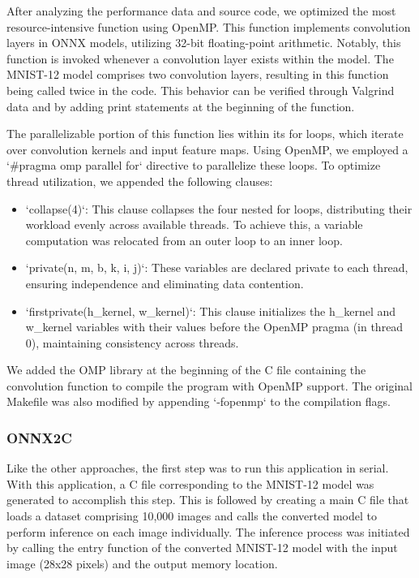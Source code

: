 \documentclass[fleqn,10pt]{olplainarticle}
\begin{document}
After analyzing the performance data and source code, we optimized the most resource-intensive function using OpenMP. This function implements convolution layers in ONNX models, utilizing 32-bit floating-point arithmetic. Notably, this function is invoked whenever a convolution layer exists within the model. The MNIST-12 model comprises two convolution layers, resulting in this function being called twice in the code. This behavior can be verified through Valgrind data and by adding print statements at the beginning of the function.

The parallelizable portion of this function lies within its for loops, which iterate over convolution kernels and input feature maps. Using OpenMP, we employed a `\#pragma omp parallel for` directive to parallelize these loops. To optimize thread utilization, we appended the following clauses:
\begin{itemize}
    \item `collapse(4)`: This clause collapses the four nested for loops, distributing their workload evenly across available threads. To achieve this, a variable computation was relocated from an outer loop to an inner loop.
    \item `private(n, m, b, k, i, j)`: These variables are declared private to each thread, ensuring independence and eliminating data contention.
    \item `firstprivate(h\_kernel, w\_kernel)`: This clause initializes the h\_kernel and w\_kernel variables with their values before the OpenMP pragma (in thread 0), maintaining consistency across threads.
\end{itemize}

We added the OMP library at the beginning of the C file containing the convolution function to compile the program with OpenMP support. The original Makefile was also modified by appending `-fopenmp` to the compilation flags.

\subsubsection{ONNX2C}
Like the other approaches, the first step was to run this application in serial. With this application, a C file corresponding to the MNIST-12 model was generated to accomplish this step. This is followed by creating a main C file that loads a dataset comprising 10,000 images and calls the converted model to perform inference on each image individually. The inference process was initiated by calling the entry function of the converted MNIST-12 model with the input image (28x28 pixels) and the output memory location.
\end{document}
